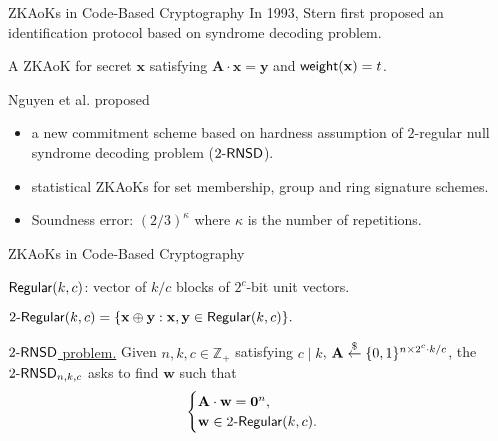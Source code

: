\begin{frame}{ZKAoKs in Code-Based Cryptography}
	In 1993, Stern first proposed an identification protocol \cite{Stern93} based on syndrome decoding problem.\pause
	
	A ZKAoK for secret $\mathbf{x}$ satisfying $\mathbf{A}\cdot\mathbf{x} = \mathbf{y}$ and $\mathsf{weight}(\mathbf{x}) = t$. \pause
	
	Nguyen et al. \cite{NguyenTWZ19, NguyenTWZ19eprint} proposed \pause
	\begin{itemize}
		\item a new commitment scheme based on hardness assumption of $2$-regular null syndrome decoding problem (${2\textsf{-}\mathsf{RNSD}}$).\pause
		\item statistical ZKAoKs for set membership, group and ring signature schemes.\pause 
		\item Soundness error: $(2/3)^\kappa$ where $\kappa$ is the number of repetitions.
	\end{itemize}
\end{frame}

\begin{frame}{ZKAoKs in Code-Based Cryptography}
	
		$\mathsf{Regular}(k,c)$: vector of $k/c$ blocks of $2^c$-bit unit vectors.\pause
	
		$2\textsf{-}\mathsf{Regular}(k,c) = \{\mathbf{x}\oplus\mathbf{y}: \mathbf{x}, \mathbf{y} \in \mathsf{Regular}(k, c)\}.$\pause
	
		\underline{${2\textsf{-}\mathsf{RNSD}}$ problem.}  Given $n, k, c \in \mathbb{Z}_+$ satisfying $c \mid k$, $\mathbf{A}\stackrel{\$}{\leftarrow}\{0,1\}^{n\times 2^c\cdot k/c}$, the ${2\textsf{-}\mathsf{RNSD}}_{n,k,c}$ asks to find $\mathbf{w}$ such that \pause$$\begin{cases}
			\mathbf{A}\cdot \mathbf{w} = \mathbf{0}^{n},\\
			\mathbf{w}\in2\textsf{-}\mathsf{Regular}(k,c).
		\end{cases}$$
\end{frame}
\begin{comment}
\begin{frame}{ZKAoKs in Code-Based Cryptography}
	\underline{Abstraction of Stern \cite{NguyenTWZ19}.} 
	
	{
		\setbeamercolor{block}{bg=red, fg=white}
		\begin{block}{\tiny 1. Commitment}
		Prover samples $\mathbf{r} \uniformly\{0,1\}^D$, $\phi \uniformly \PermutationSet$ 
		
		and randomness $\rho_1, \rho_2, \rho_3$:
		\begin{itemize}
			\item $C_1 = \CCom(\phi, \mathbf{M}\cdot\mathbf{r}; \rho_1)$.
			\item $C_2 = \CCom(\Gamma_\phi(\mathbf{r}); \rho_2)$.
			\item $C_3 = \CCom(\Gamma_\phi(\mathbf{w} \oplus \mathbf{r}); \rho_3)$.
		\end{itemize}
	\end{block}}
\end{frame}
\end{comment}

